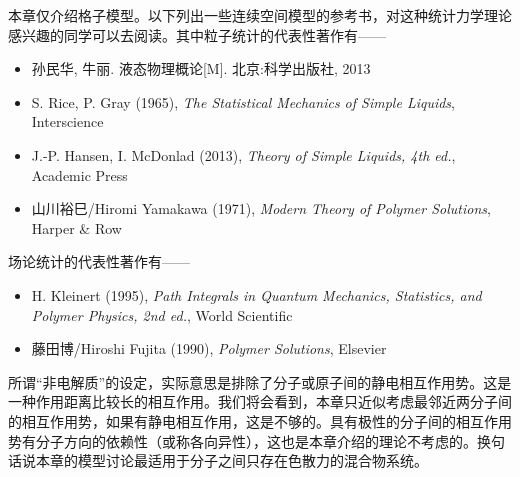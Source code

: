 \documentclass[main.tex]{subfiles}
\begin{document}
本章仅介绍格子模型。以下列出一些连续空间模型的参考书，对这种统计力学理论感兴趣的同学可以去阅读。其中粒子统计的代表性著作有——
\begin{itemize}
    \item 孙民华, 牛丽. 液态物理概论[M]. 北京:科学出版社, 2013
    \item S. Rice, P. Gray (1965), \emph{The Statistical Mechanics of Simple Liquids}, Interscience
    \item J.-P. Hansen, I. McDonlad (2013), \emph{Theory of Simple Liquids, 4th ed.}, Academic Press
    \item 山川裕巳/Hiromi Yamakawa (1971), \emph{Modern Theory of Polymer Solutions}, Harper \& Row
\end{itemize}
场论统计的代表性著作有——
\begin{itemize}
    \item H. Kleinert (1995), \emph{Path Integrals in Quantum Mechanics, Statistics, and Polymer Physics, 2nd ed.}, World Scientific
    \item 藤田博/Hiroshi Fujita (1990), \emph{Polymer Solutions}, Elsevier
\end{itemize}

所谓“非电解质”的设定，实际意思是排除了分子或原子间的静电相互作用势。这是一种作用距离比较长的相互作用。我们将会看到，本章只近似考虑最邻近两分子间的相互作用势，如果有静电相互作用，这是不够的。具有极性的分子间的相互作用势有分子方向的依赖性（或称各向异性），这也是本章介绍的理论不考虑的。换句话说本章的模型讨论最适用于分子之间只存在色散力的混合物系统。
\end{document}
